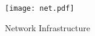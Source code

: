 \documentclass[../documentation.tex]{subfiles}
\begin{document}
\begin{figure}[h]
    \centering
    \texttt{[image: net.pdf]}
    \caption{Network Infrastructure}
\end{figure}
\end{document}
